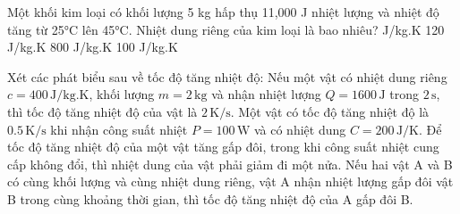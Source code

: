 \begin{ex}
Một khối kim loại có khối lượng 5 kg hấp thụ 11,000 J nhiệt lượng và nhiệt độ tăng từ 25°C lên 45°C. Nhiệt dung riêng của kim loại là bao nhiêu?
\choice
{ J/kg.K}
{120 J/kg.K}
{800 J/kg.K}
{100 J/kg.K}
\end{ex}
\begin{ex}
Xét các phát biểu sau về tốc độ tăng nhiệt độ:
\choiceTF
{Nếu một vật có nhiệt dung riêng $c = 400 \, \text{J/kg.K}$, khối lượng $m = 2 \, \text{kg}$ và nhận nhiệt lượng $Q = 1600 \, \text{J}$ trong $2 \, \text{s}$, thì tốc độ tăng nhiệt độ của vật là $2 \, \text{K/s}$.}
{Một vật có tốc độ tăng nhiệt độ là $0.5 \, \text{K/s}$ khi nhận công suất nhiệt $P = 100 \, \text{W}$ và có nhiệt dung $C = 200 \, \text{J/K}$.}
{Để tốc độ tăng nhiệt độ của một vật tăng gấp đôi, trong khi công suất nhiệt cung cấp không đổi, thì nhiệt dung của vật phải giảm đi một nửa.}
{Nếu hai vật A và B có cùng khối lượng và cùng nhiệt dung riêng, vật A nhận nhiệt lượng gấp đôi vật B trong cùng khoảng thời gian, thì tốc độ tăng nhiệt độ của A gấp đôi B.}
\end{ex}

